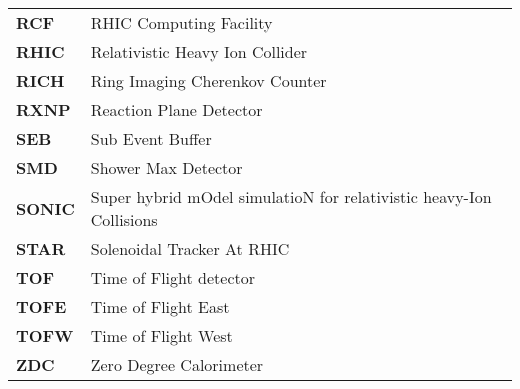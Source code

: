 \begin{center}
\begin{longtable}{l   | l}
\textbf{RCF}       & RHIC Computing Facility                                             \\
\textbf{RHIC}      & Relativistic Heavy Ion Collider                                     \\
\textbf{RICH}      & Ring Imaging Cherenkov Counter                                      \\
\textbf{RXNP}      & Reaction Plane Detector                                             \\
\textbf{SEB}       & Sub Event Buffer                                                    \\
\textbf{SMD}       & Shower Max Detector                                                 \\
\textbf{SONIC}     & Super hybrid mOdel simulatioN for relativistic heavy-Ion Collisions \\
\textbf{STAR}      & Solenoidal Tracker At RHIC                                          \\
\textbf{TOF}       & Time of Flight detector                                             \\
\textbf{TOFE}      & Time of Flight East                                                 \\
\textbf{TOFW}      & Time of Flight West                                                 \\
\textbf{ZDC}       & Zero Degree Calorimeter                                             \\                  

\end{longtable}
\end{center}